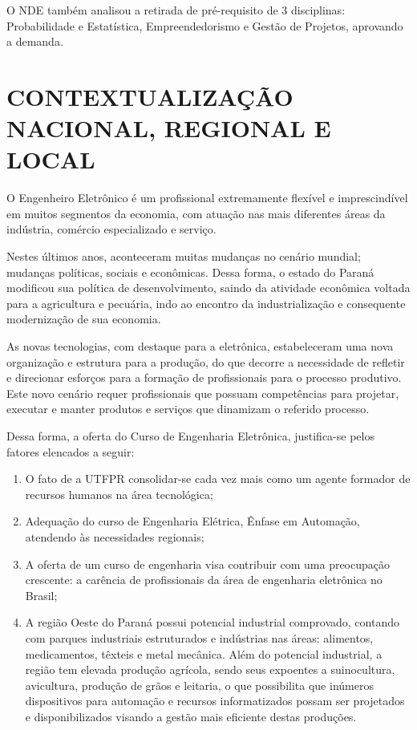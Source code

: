 O NDE também analisou a retirada de pré-requisito de 3 disciplinas: Probabilidade e Estatística, Empreendedorismo e Gestão de Projetos, aprovando a demanda.

\section{CONTEXTUALIZAÇÃO NACIONAL, REGIONAL E LOCAL}

O Engenheiro Eletrônico é um profissional extremamente flexível e imprescindível em muitos segmentos da economia, com atuação nas mais diferentes áreas da indústria, comércio especializado e serviço.

Nestes últimos anos, aconteceram muitas mudanças no cenário mundial; mudanças políticas, sociais e econômicas. Dessa forma, o estado do Paraná modificou sua política de desenvolvimento, saindo da atividade econômica voltada para a agricultura e pecuária, indo ao encontro da industrialização e consequente modernização de sua economia.

As novas tecnologias, com destaque para a eletrônica, estabeleceram uma nova organização e estrutura para a produção, do que decorre a necessidade de refletir e direcionar esforços para a formação de profissionais para o processo produtivo. Este novo cenário requer profissionais que possuam competências para projetar, executar e manter produtos e serviços que dinamizam o referido processo.

Dessa forma, a oferta do Curso de Engenharia Eletrônica, justifica-se pelos fatores elencados a seguir:

\begin{enumerate}
	
	\item O fato de a UTFPR consolidar-se cada vez mais como um agente formador de recursos humanos na área tecnológica;
	
	\item Adequação do curso de Engenharia Elétrica, Ênfase em Automação, atendendo às necessidades regionais;
	
	\item A oferta de um curso de engenharia visa contribuir com uma preocupação crescente: a carência de profissionais da área de engenharia eletrônica no Brasil;
	
	\item A região Oeste do Paraná possui potencial industrial comprovado, contando com parques industriais estruturados e indústrias nas áreas: alimentos, medicamentos, têxteis e metal mecânica. Além do potencial industrial, a região tem elevada produção agrícola, sendo seus expoentes a suinocultura, avicultura, produção de grãos e leitaria, o que possibilita que inúmeros dispositivos para automação e recursos informatizados possam ser projetados e disponibilizados visando a gestão mais eficiente destas produções.
	
\end{enumerate}


